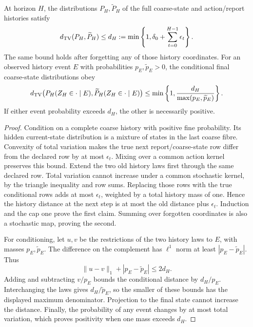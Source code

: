 \begin{proposition}\label{r:history-bound}
At horizon $H$, the distributions $P_H,\widetilde P_H$ of the full coarse-state and action/report histories satisfy
\[
 d_{\mathrm{TV}}(P_H,\widetilde P_H)\le d_H:=\min\left\{1,\delta_0+\sum_{t=0}^{H-1}\epsilon_t\right\}.
\]
The same bound holds after forgetting any of those history coordinates. For an observed history event $E$ with probabilities $p_E,\widetilde p_E>0$, the conditional final coarse-state distributions obey
\[
 d_{\mathrm{TV}}\bigl(P_H(Z_H\in\cdot\mid E),\widetilde P_H(Z_H\in\cdot\mid E)\bigr)
 \le\min\left\{1,\frac{d_H}{\max(p_E,\widetilde p_E)}\right\}.
\]
If either event probability exceeds $d_H$, the other is necessarily positive.
\end{proposition}
\begin{proof}
Condition on a complete coarse history with positive fine probability. Its hidden current-state distribution is a mixture of states in the last coarse fibre. Convexity of total variation makes the true next report/coarse-state row differ from the declared row by at most $\epsilon_t$. Mixing over a common action kernel preserves this bound. Extend the two old history laws first through the same declared row. Total variation cannot increase under a common stochastic kernel, by the triangle inequality and row sums. Replacing those rows with the true conditional rows adds at most $\epsilon_t$, weighted by a total history mass of one. Hence the history distance at the next step is at most the old distance plus $\epsilon_t$. Induction and the cap one prove the first claim. Summing over forgotten coordinates is also a stochastic map, proving the second.

For conditioning, let $u,v$ be the restrictions of the two history laws to $E$, with masses $p_E,\widetilde p_E$. The difference on the complement has $\ell^1$ norm at least $|p_E-\widetilde p_E|$. Thus
\[
 \|u-v\|_1+|p_E-\widetilde p_E|\le2d_H.
\]
Adding and subtracting $v/p_E$ bounds the conditional distance by $d_H/p_E$. Interchanging the laws gives $d_H/\widetilde p_E$, so the smaller of these bounds has the displayed maximum denominator. Projection to the final state cannot increase the distance. Finally, the probability of any event changes by at most total variation, which proves positivity when one mass exceeds $d_H$.
\end{proof}

